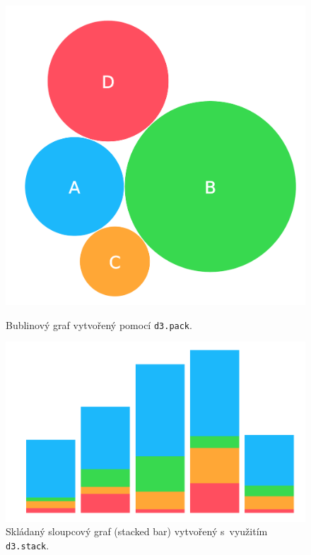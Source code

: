 \documentclass[
  digital, %
  oneside, %
  table,   %
  nolof,     %
  nolot,     %
  nocover
]{fithesis3}
\begin{document}
\begin{figure}[H]
  \RawFloats
  \centering
  \begin{minipage}[b]{0.35\textwidth}
  	\centering
    \includegraphics[width=\textwidth]{images/bubble.pdf}
    \caption{Bublinový graf vytvořený pomocí \texttt{d3.pack}.}
    \label{fig:bubbleChart}
  \end{minipage}
  \hfill
  \begin{minipage}[b]{0.5\textwidth}
    \includegraphics[width=\textwidth]{images/stack.pdf}
    \caption{Skládaný sloupcový graf (stacked bar) vytvořený s~využitím \texttt{d3.stack}.}
    \label{fig:stackBarChart}
  \end{minipage}
\end{figure}
\end{document}
